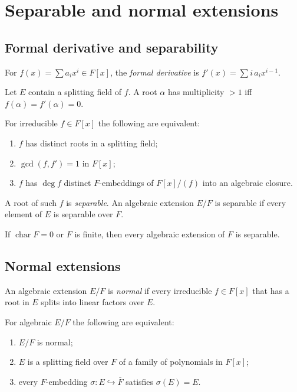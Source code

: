 \section{Separable and normal extensions}\label{sec:sep-normal}

\subsection{Formal derivative and separability}
\begin{definition}
For $f(x)=\sum a_i x^i\in F[x]$, the \emph{formal derivative} is $f'(x)=\sum i\,a_i x^{i-1}$.
\end{definition}
\begin{proposition}
Let $E$ contain a splitting field of $f$. A root $\alpha$ has multiplicity $>1$ iff $f(\alpha)=f'(\alpha)=0$.
\end{proposition}
\begin{theorem}[Criteria]
For irreducible $f\in F[x]$ the following are equivalent:
\begin{enumerate}[label=(\alph*)]
\item $f$ has distinct roots in a splitting field;
\item $\gcd(f,f')=1$ in $F[x]$;
\item $f$ has $\deg f$ distinct $F$-embeddings of $F[x]/(f)$ into an algebraic closure.
\end{enumerate}
A root of such $f$ is \emph{separable}. An algebraic extension $E/F$ is separable if every element of $E$ is separable over $F$.
\end{theorem}
\begin{corollary}
If $\operatorname{char}F=0$ or $F$ is finite, then every algebraic extension of $F$ is separable.
\end{corollary}

\subsection{Normal extensions}
\begin{definition}
An algebraic extension $E/F$ is \emph{normal} if every irreducible $f\in F[x]$ that has a root in $E$ splits into linear factors over $E$.
\end{definition}
\begin{theorem}
For algebraic $E/F$ the following are equivalent:
\begin{enumerate}[label=(\alph*)]
\item $E/F$ is normal;
\item $E$ is a splitting field over $F$ of a family of polynomials in $F[x]$;
\item every $F$-embedding $\sigma:E\hookrightarrow \overline{F}$ satisfies $\sigma(E)=E$.
\end{enumerate}
\end{theorem}

